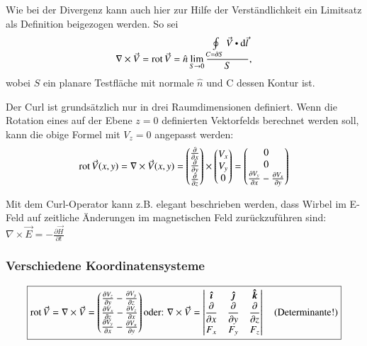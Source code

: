 Wie bei der Divergenz kann auch hier zur Hilfe der Verständlichkeit ein Limitsatz als Definition beigezogen werden.
So sei
\[
    \nabla\times\vec{V} = \rot \vec{V} = \hat{n} \lim_{S \to 0}\frac{\oint\limits_{C = \partial S}\vec{V} \dotp \diff \vec{l}}{S},
\]
wobei $S$ ein planare Testfläche mit normale $\hat{n}$ und C dessen Kontur ist. 


Der Curl ist grundsätzlich nur in drei Raumdimensionen definiert.
Wenn die Rotation eines auf der Ebene $z=0$ definierten Vektorfelds berechnet werden soll, kann die obige Formel mit $V_z = 0$ angepasst werden:
\[
    \operatorname{rot} \vec{V}(x, y)
    = \nabla \times \vec{V}(x, y)
    =   \begin{pmatrix}
            \frac{\partial}{\partial x}\\
            \frac{\partial}{\partial y}\\
            \frac{\partial}{\partial z}
        \end{pmatrix} \times 
    \begin{pmatrix}
        V_x \\ V_y \\ 0
    \end{pmatrix} =
    \begin{pmatrix}
        0 \\
        0 \\
        \frac{\partial V_y}{\partial x} - \frac{\partial V_x}{\partial y}
    \end{pmatrix}
\]

\begin{outline}
    \1 Mit dem Curl-Operator kann z.B. elegant beschrieben werden, dass Wirbel im E-Feld auf zeitliche Änderungen im magnetischen Feld zurückzuführen sind:
        \2[] $\nabla \times \vec{E} = -\frac{\partial \vec{H}}{\partial t}$
\end{outline}


\subsubsection{Verschiedene Koordinatensysteme}
\[
    \boxed{
        \operatorname{rot} \vec{V}
        = \nabla \times \vec{V}
        = \begin{pmatrix}
            \frac{\partial V_z}{\partial y} - \frac{\partial V_y}{\partial z}\\
            \frac{\partial V_x}{\partial z} - \frac{\partial V_z}{\partial x}\\
            \frac{\partial V_y}{\partial x} - \frac{\partial V_x}{\partial y}\\
        \end{pmatrix}
         \text{oder: }
        \nabla \times \vec {V} 
        = 
        \begin{vmatrix}
        {\boldsymbol {\hat {\imath }}}&{\boldsymbol {\hat {\jmath }}}&{\boldsymbol {\hat {k}}}\\
        {\dfrac {\partial }{\partial x}}&{\dfrac {\partial }{\partial y}}&{\dfrac {\partial }{\partial z}}\\
        F_{x}&F_{y}&F_{z}
        \end{vmatrix} 
        \quad 
        (\text{Determinante!})
    }
\]

